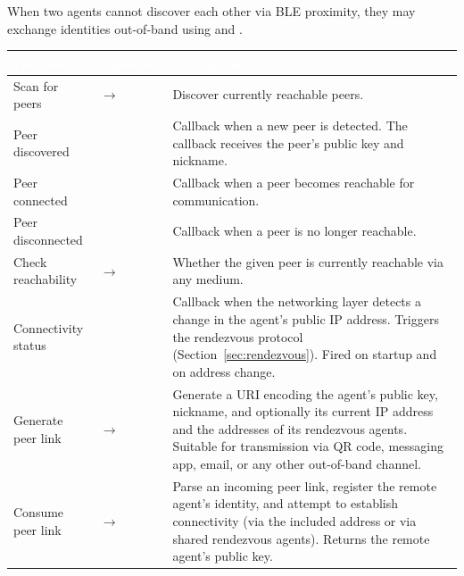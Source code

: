 When two agents cannot discover each other via BLE proximity, they may exchange identities out-of-band using  and .
\begin{longtable}{L{4cm} L{5cm} L{5cm}}
\toprule
{}
\textcolor{white}{\textbf{Function}} &
\textcolor{white}{\textbf{Signature}} &
\textcolor{white}{\textbf{Description}} \\
\midrule
\endhead
Scan for peers &  $\to$  & Discover currently reachable peers. \\
Peer discovered &  & Callback when a new peer is detected. The callback receives the peer's public key and nickname. \\
Peer connected &  & Callback when a peer becomes reachable for communication. \\
Peer disconnected &  & Callback when a peer is no longer reachable. \\
Check reachability &  $\to$  & Whether the given peer is currently reachable via any medium. \\
Connectivity status &  & Callback when the networking layer detects a change in the agent's public IP address.  Triggers the rendezvous protocol (Section~\ref{sec:rendezvous}).  Fired on startup and on address change. \\
Generate peer link &  $\to$  & Generate a URI encoding the agent's public key, nickname, and optionally its current IP address and the addresses of its rendezvous agents. Suitable for transmission via QR code, messaging app, email, or any other out-of-band channel. \\
Consume peer link &  $\to$  & Parse an incoming peer link, register the remote agent's identity, and attempt to establish connectivity (via the included address or via shared rendezvous agents). Returns the remote agent's public key. \\
\bottomrule
\end{longtable}
